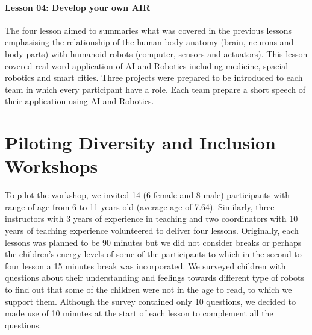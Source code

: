 \documentclass[conference]{IEEEtran}
\begin{document}
\paragraph{Lesson 04: Develop your own AIR}
The four lesson aimed to summaries what was covered in the previous lessons emphasising the relationship of the human body anatomy (brain, neurons and body parts) with humanoid robots (computer, sensors and actuators).
This lesson covered real-word application of AI and Robotics including medicine, spacial robotics and smart cities. 
Three projects were prepared to be introduced to each team in which every participant have a role. 
Each team prepare a short speech of their application using AI and Robotics. 
\section{Piloting Diversity and Inclusion Workshops}
To pilot the workshop, we invited 14 (6 female and 8 male) participants with range of age from 6 to 11 years old (average age of 7.64).
Similarly, three instructors with 3 years of experience in teaching and two coordinators with 10 years of teaching experience volunteered to deliver four lessons.
Originally, each lessons was planned to be 90 minutes but we did not consider breaks or perhaps the children's energy levels of some of the participants to which in the second to four lesson a 15 minutes break was incorporated.
We surveyed children with questions about their understanding and feelings towards different type of robots to find out that some of the children were not in the age to read, to which we support them. 
Although the survey contained only 10 questions, we decided to made use of 10 minutes at the start of each lesson to complement all the questions.
\end{document}
